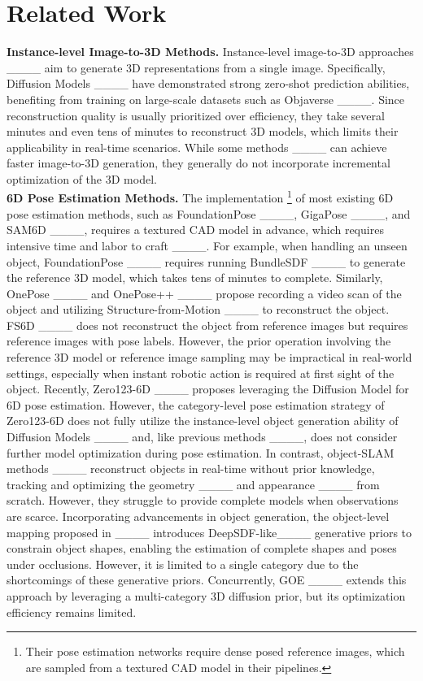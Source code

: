\section{Related Work}
\label{rel}
\noindent\textbf{Instance-level Image-to-3D Methods.}
Instance-level image-to-3D approaches ____ aim to generate 3D representations from a single image. Specifically, Diffusion Models ____ have demonstrated strong zero-shot prediction abilities, benefiting from training on large-scale datasets such as Objaverse ____. Since reconstruction quality is usually prioritized over efficiency, they take several minutes and even tens of minutes to reconstruct 3D models, which limits their applicability in real-time scenarios. While some methods ____ can achieve faster image-to-3D generation, they generally do not incorporate incremental optimization of the 3D model.\\
\noindent\textbf{6D Pose Estimation Methods.}
The implementation \footnote{Their pose estimation networks require dense posed reference images, which are sampled from a textured CAD model in their pipelines.} of most existing 6D pose estimation methods, such as FoundationPose ____, GigaPose ____, and SAM6D ____, requires a textured CAD model in advance, which requires intensive time and labor to craft ____. For example, when handling an unseen object, FoundationPose ____ requires running BundleSDF ____ to generate the reference 3D model, which takes tens of minutes to complete. Similarly, OnePose ____ and OnePose++ ____ propose recording a video scan of the object and utilizing Structure-from-Motion ____ to reconstruct the object. FS6D ____ does not reconstruct the object from reference images but requires reference images with pose labels. However, the prior operation involving the reference 3D model or reference image sampling may be impractical in real-world settings, especially when instant robotic action is required at first sight of the object. Recently, Zero123-6D ____ proposes leveraging the Diffusion Model for 6D pose estimation. However, the category-level pose estimation strategy of Zero123-6D does not fully utilize the instance-level object generation ability of Diffusion Models ____ and, like previous methods ____, does not consider further model optimization during pose estimation. In contrast, object-SLAM methods ____ reconstruct objects in real-time without prior knowledge, tracking and optimizing the geometry ____ and appearance ____ from scratch. However, they struggle to provide complete models when observations are scarce. Incorporating advancements in object generation, the object-level mapping proposed in ____ introduces DeepSDF-like____ generative priors to constrain object shapes, enabling the estimation of complete shapes and poses under occlusions. However, it is limited to a single category due to the shortcomings of these generative priors. Concurrently, GOE ____ extends this approach by leveraging a multi-category 3D diffusion prior, but its optimization efficiency remains limited.

